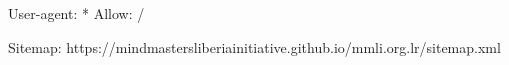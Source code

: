 User-agent: *
Allow: /

Sitemap: https://mindmastersliberiainitiative.github.io/mmli.org.lr/sitemap.xml
